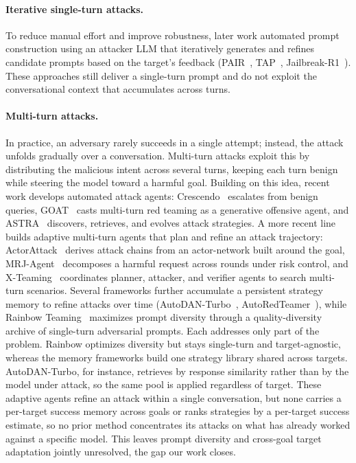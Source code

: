 \paragraph{Iterative single-turn attacks.}
To reduce manual effort and improve robustness, later work automated prompt construction using an attacker LLM that iteratively generates and refines candidate prompts based on the target's feedback (PAIR~\cite{pair}, TAP~\cite{tap}, Jailbreak-R1~\cite{jbr1}).
These approaches still deliver a single-turn prompt and do not exploit the conversational context that accumulates across turns.

\paragraph{Multi-turn attacks.}
In practice, an adversary rarely succeeds in a single attempt; instead, the attack unfolds gradually over a conversation.
Multi-turn attacks exploit this by distributing the malicious intent across several turns, keeping each turn benign while steering the model toward a harmful goal.
Building on this idea, recent work develops automated attack agents: Crescendo~\cite{crescendo} escalates from benign queries, GOAT~\cite{goat} casts multi-turn red teaming as a generative offensive agent, and ASTRA~\cite{astra} discovers, retrieves, and evolves attack strategies.
A more recent line builds adaptive multi-turn agents that plan and refine an attack trajectory: ActorAttack~\cite{actorattack} derives attack chains from an actor-network built around the goal, MRJ-Agent~\cite{mrjagent} decomposes a harmful request across rounds under risk control, and X-Teaming~\cite{xteaming} coordinates planner, attacker, and verifier agents to search multi-turn scenarios.
Several frameworks further accumulate a persistent strategy memory to refine attacks over time (AutoDAN-Turbo~\cite{autodanturbo}, AutoRedTeamer~\cite{autoredteamer}), while Rainbow Teaming~\cite{rainbow} maximizes prompt diversity through a quality-diversity archive of single-turn adversarial prompts.
Each addresses only part of the problem. Rainbow optimizes diversity but stays single-turn and target-agnostic, whereas the memory frameworks build one strategy library shared across targets. AutoDAN-Turbo, for instance, retrieves by response similarity rather than by the model under attack, so the same pool is applied regardless of target.
These adaptive agents refine an attack within a single conversation, but none carries a per-target success memory across goals or ranks strategies by a per-target success estimate, so no prior method concentrates its attacks on what has already worked against a specific model. This leaves prompt diversity and cross-goal target adaptation jointly unresolved, the gap our work closes.
